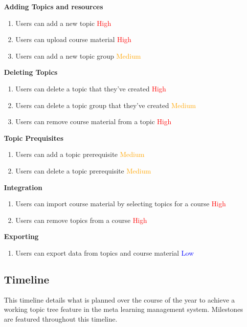 \textbf{Adding Topics and resources}
    \begin{enumerate}
    \item Users can add a new topic \textcolor{Red}{High}
    \item Users can upload course material \textcolor{Red}{High}
    \item Users can add a new topic group \textcolor{Orange}{Medium}
    \end{enumerate}

\textbf{Deleting Topics}
    \begin{enumerate}
    \item Users can delete a topic that they've created \textcolor{Red}{High}
    \item Users can delete a topic group that they've created \textcolor{Orange}{Medium}
    \item Users can remove course material from a topic \textcolor{Red}{High}
    \end{enumerate}

\textbf{Topic Prequisites}
    \begin{enumerate}
    \item Users can add a topic prerequisite \textcolor{Orange}{Medium}
    \item Users can delete a topic prerequisite \textcolor{Orange}{Medium}
    \end{enumerate}

\textbf{Integration}
    \begin{enumerate}
    \item Users can import course material by selecting topics for a course \textcolor{Red}{High}
    \item Users can remove topics from a course \textcolor{Red}{High}
    \end{enumerate}

\textbf{Exporting}
    \begin{enumerate}
    \item Users can export data from topics and course material \textcolor{Blue}{Low}
    \end{enumerate}

\subsection{Timeline}
This timeline details what is planned over the course of the year to achieve a working topic tree feature in the meta learning management system.
Milestones are featured throughout this timeline.

